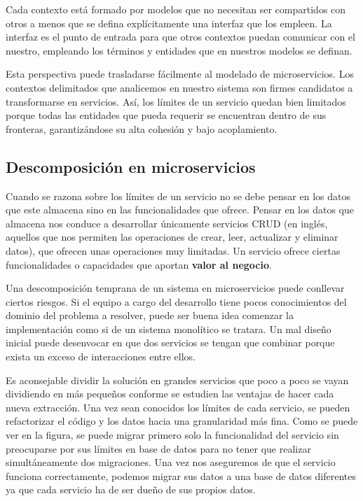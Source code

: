 \documentclass[11pt,spanish,listoffigures]{tfgetsinf}
\begin{document}
Cada contexto está formado por modelos que no necesitan ser compartidos con otros a menos que se defina explícitamente una interfaz que los empleen. La interfaz es el punto de entrada para que otros contextos puedan comunicar con el nuestro, empleando los términos y entidades que en nuestros modelos se definan.

Esta perspectiva puede trasladarse fácilmente al modelado de microservicios. Los contextos delimitados que analicemos en nuestro sistema son firmes candidatos a transformarse en servicios. Así, los límites de un servicio quedan bien limitados porque  todas las entidades que pueda requerir se encuentran dentro de sus fronteras, garantizándose su alta cohesión y bajo acoplamiento. \cite{Newman2015a}

\subsection{Descomposición en microservicios} \label{subsect:Descomposicion}

Cuando se razona sobre los límites de un servicio no se debe pensar en los datos que este almacena sino en las funcionalidades que ofrece. Pensar en los datos que almacena nos conduce a desarrollar únicamente servicios CRUD (en inglés, aquellos que nos permiten las operaciones de crear, leer, actualizar y eliminar datos), que ofrecen unas operaciones muy limitadas. Un servicio ofrece ciertas funcionalidades o capacidades que aportan \textbf{valor al negocio}.

Una descomposición temprana de un sistema en microservicios puede conllevar ciertos riesgos. Si el equipo a cargo del desarrollo tiene pocos conocimientos del dominio del problema a resolver, puede  ser buena idea comenzar la implementación como si de un sistema monolítico se tratara. Un mal diseño inicial puede desenvocar en que dos servicios se tengan que combinar porque exista un exceso de interacciones entre ellos. 

Es aconsejable dividir la solución en grandes servicios que poco a poco se vayan dividiendo en más pequeños conforme se estudien las ventajas de hacer cada nueva extracción. Una vez sean conocidos los límites de cada servicio, se pueden refactorizar el código y los datos hacia una granularidad más fina. Como se puede ver en la figura, se puede migrar primero solo la funcionalidad del servicio sin preocuparse por sus límites en base de datos para no tener que realizar simultáneamente dos migraciones. Una vez nos aseguremos de que el servicio funciona correctamente, podemos migrar sus datos a una base de datos diferentes ya que cada servicio ha de ser dueño de sus propios datos. \cite{Richards2016}
\end{document}
